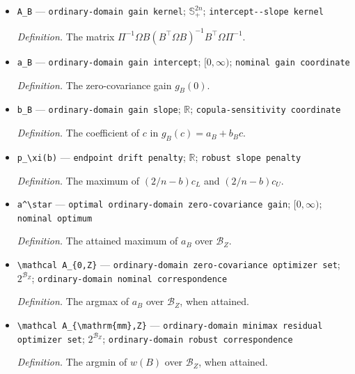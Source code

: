\documentclass{article}
\begin{document}
\begin{itemize}
  \item \texttt{A\_\allowbreak{}B} --- \texttt{ordinary-\allowbreak{}domain gain kernel}; \(\mathbb S_+^{2n}\); \texttt{intercept-\allowbreak{}-\allowbreak{}slope kernel}
  \par\smallskip\noindent\emph{Definition.} The matrix \(\Pi^{-1}\Omega B(B^{\top}\Omega B)^{-1}B^{\top}\Omega\Pi^{-1}\).
  \item \texttt{a\_\allowbreak{}B} --- \texttt{ordinary-\allowbreak{}domain gain intercept}; \([0,\infty)\); \texttt{nominal gain coordinate}
  \par\smallskip\noindent\emph{Definition.} The zero-covariance gain \(g_B(0)\).
  \item \texttt{b\_\allowbreak{}B} --- \texttt{ordinary-\allowbreak{}domain gain slope}; \(\mathbb R\); \texttt{copula-\allowbreak{}sensitivity coordinate}
  \par\smallskip\noindent\emph{Definition.} The coefficient of \(c\) in \(g_B(c)=a_B+b_Bc\).
  \item \texttt{p\_\allowbreak{}\textbackslash{}\allowbreak{}xi(b)} --- \texttt{endpoint drift penalty}; \(\mathbb R\); \texttt{robust slope penalty}
  \par\smallskip\noindent\emph{Definition.} The maximum of \((2/n-b)c_L\) and \((2/n-b)c_U\).
  \item \texttt{a\textasciicircum{}\textbackslash{}\allowbreak{}star} --- \texttt{optimal ordinary-\allowbreak{}domain zero-\allowbreak{}covariance gain}; \([0,\infty)\); \texttt{nominal optimum}
  \par\smallskip\noindent\emph{Definition.} The attained maximum of \(a_B\) over \(\mathcal B_Z\).
  \item \texttt{\textbackslash{}\allowbreak{}mathcal A\_\allowbreak{}\{0,\allowbreak{}Z\}\allowbreak{}} --- \texttt{ordinary-\allowbreak{}domain zero-\allowbreak{}covariance optimizer set}; \(2^{\mathcal B_Z}\); \texttt{ordinary-\allowbreak{}domain nominal correspondence}
  \par\smallskip\noindent\emph{Definition.} The argmax of \(a_B\) over \(\mathcal B_Z\), when attained.
  \item \texttt{\textbackslash{}\allowbreak{}mathcal A\_\allowbreak{}\{\textbackslash{}\allowbreak{}mathrm\{mm\}\allowbreak{},\allowbreak{}Z\}\allowbreak{}} --- \texttt{ordinary-\allowbreak{}domain minimax residual optimizer set}; \(2^{\mathcal B_Z}\); \texttt{ordinary-\allowbreak{}domain robust correspondence}
  \par\smallskip\noindent\emph{Definition.} The argmin of \(w(B)\) over \(\mathcal B_Z\), when attained.

\end{itemize}
\end{document}
